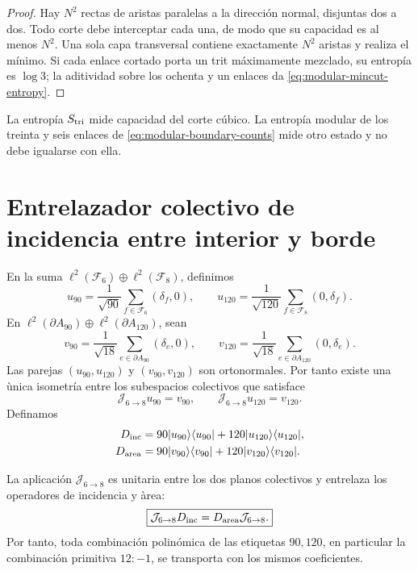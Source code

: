 \begin{proof}
Hay \(N^2\) rectas de aristas paralelas a la direcci\'on normal, disjuntas
dos a dos. Todo corte debe interceptar cada una, de modo que su capacidad
es al menos \(N^2\). Una sola capa transversal contiene exactamente
\(N^2\) aristas y realiza el m\'inimo. Si cada enlace cortado porta un trit
m\'aximamente mezclado, su entrop\'ia es \(\log3\); la aditividad sobre los
ochenta y un enlaces da \cref{eq:modular-mincut-entropy}.
\end{proof}

La entrop\'ia \(S_{\rm tri}\) mide capacidad del corte c\'ubico. La
entrop\'ia modular de los treinta y seis enlaces de
\cref{eq:modular-boundary-counts} mide otro estado y no debe igualarse con
ella.

\section{Entrelazador colectivo de incidencia entre interior y borde}

En la suma
\(\ell^2(\mathcal F_6)\oplus\ell^2(\mathcal F_8)\), definimos
\begin{equation}
\label{eq:modular-u90-u120}
u_{90}=\frac1{\sqrt{90}}\sum_{f\in\mathcal F_6}(\delta_f,0),
\qquad
u_{120}=\frac1{\sqrt{120}}\sum_{f\in\mathcal F_8}(0,\delta_f).
\end{equation}
En
\(\ell^2(\partial A_{90})\oplus\ell^2(\partial A_{120})\), sean
\begin{equation}
\label{eq:modular-v90-v120}
v_{90}=\frac1{\sqrt{18}}\sum_{e\in\partial A_{90}}(\delta_e,0),
\qquad
v_{120}=\frac1{\sqrt{18}}\sum_{e\in\partial A_{120}}(0,\delta_e).
\end{equation}
Las parejas \((u_{90},u_{120})\) y \((v_{90},v_{120})\) son ortonormales.
Por tanto existe una \`unica isometr\'ia entre los subespacios colectivos
que satisface
\begin{equation}
\label{eq:modular-J68}
\mathcal J_{6\to8}u_{90}=v_{90},
\qquad
\mathcal J_{6\to8}u_{120}=v_{120}.
\end{equation}
Definamos
\begin{align}
D_{\rm inc}
&=90|u_{90}\rangle\langle u_{90}|
+120|u_{120}\rangle\langle u_{120}|,
\label{eq:modular-Dinc}\\
D_{\rm area}
&=90|v_{90}\rangle\langle v_{90}|
+120|v_{120}\rangle\langle v_{120}|.
\label{eq:modular-Darea}
\end{align}

\begin{theorem}
\label{thm:modular-J68}
La aplicaci\'on \(\mathcal J_{6\to8}\) es unitaria entre los dos planos
colectivos y entrelaza los operadores de incidencia y \`area:
\begin{equation}
\label{eq:modular-J-intertwining}
\boxed{
\mathcal J_{6\to8}D_{\rm inc}
=D_{\rm area}\mathcal J_{6\to8}.}
\end{equation}
Por tanto, toda combinaci\'on polin\'omica de las etiquetas \(90,120\), en
particular la combinaci\'on primitiva \(12:-1\), se transporta con los
mismos coeficientes.
\end{theorem}


